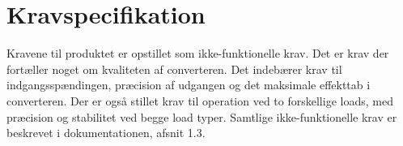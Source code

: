 \section{Kravspecifikation}
Kravene til produktet er opstillet som ikke-funktionelle krav. Det er krav der fortæller noget om kvaliteten af converteren. Det indebærer krav til indgangsspændingen, præcision af udgangen og det maksimale effekttab i converteren. Der er også stillet krav til operation ved to forskellige loads, med præcision og stabilitet ved begge load typer. Samtlige ikke-funktionelle krav er beskrevet i dokumentationen, afsnit 1.3.


